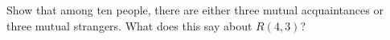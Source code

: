 \documentclass{book}
\begin{document}
\setcounter{cpjt}{49}
\addtocounter{cpjt}{-1}
\begin{activity}\label{activity-42}
\hypertarget{p-411}{}%
Show that among ten people, there are either three mutual acquaintances or three mutual strangers.  What does this say about \(R(4,3)\)?%
\par\smallskip%
\noindent\end{activity}

\clearpage
\end{document}
